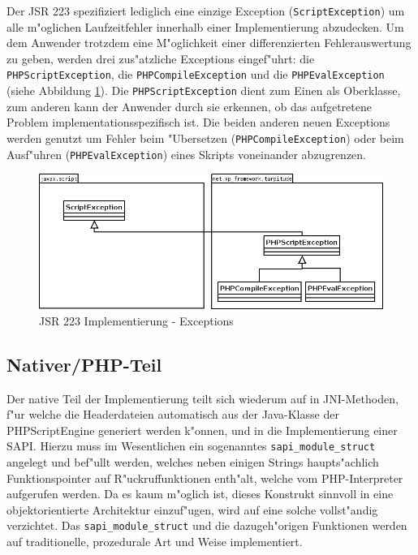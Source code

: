 Der JSR 223 spezifiziert lediglich eine einzige Exception (\texttt{ScriptException}) um alle m"oglichen Laufzeitfehler innerhalb einer 
Implementierung abzudecken. Um dem Anwender trotzdem eine M"oglichkeit einer differenzierten Fehlerauswertung zu geben, werden drei
zus"atzliche Exceptions eingef"uhrt: die \texttt{PHPScriptException}, die \texttt{PHPCompileException} und die \texttt{PHPEvalException} 
(siehe Abbildung \ref{fig:jsr223exceptions}). Die \texttt{PHPScriptException} dient zum Einen als Oberklasse, zum anderen kann der Anwender durch 
sie erkennen, ob das aufgetretene Problem implementationsspezifisch ist. Die beiden anderen neuen Exceptions werden genutzt um Fehler 
beim "Ubersetzen (\texttt{PHPCompileException}) oder beim Ausf"uhren (\texttt{PHPEvalException}) eines Skripts voneinander abzugrenzen.

\begin{figure}[h]
\includegraphics[width=\textwidth]{chap1/img/exceptions.png}
\caption{JSR 223 Implementierung - Exceptions}
\label{fig:jsr223exceptions}
\end{figure}

\subsection{Nativer/PHP-Teil}
\label{sec:chap1:design:native}

Der native Teil der Implementierung teilt sich wiederum auf in JNI-Methoden, f"ur welche die Headerdateien automatisch aus
der Java-Klasse der PHPScriptEngine generiert werden k"onnen, und in die Implementierung einer SAPI. Hierzu muss im
Wesentlichen ein sogenanntes \texttt{sapi\_module\_struct} angelegt und bef"ullt werden, welches neben einigen Strings
haupts"achlich Funktionspointer auf R"uckruffunktionen enth"alt, welche vom PHP-Interpreter aufgerufen werden. Da es
kaum m"oglich ist, dieses Konstrukt sinnvoll in eine objektorientierte Architektur einzuf"ugen, wird auf eine solche
vollst"andig verzichtet. Das \texttt{sapi\_module\_struct} und die dazugeh"origen Funktionen werden auf traditionelle,
prozedurale Art und Weise implementiert.

